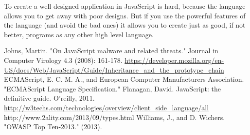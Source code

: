 \documentclass{report}
\begin{document}
To create a well designed application in JavaScript is hard, because the language allows you to get away with poor designs. But if you use the powerful features of the language (and avoid the bad ones) it allows you to create just as good, if not better, programs as any other high level language.
\begin{thebibliography}{99}
Johns, Martin. "On JavaScript malware and related threats." Journal in Computer Virology 4.3 (2008): 161-178.
\url{https://developer.mozilla.org/en-US/docs/Web/JavaScript/Guide/Inheritance\_and\_the\_prototype\_chain}
ECMAScript, E. C. M. A., and European Computer Manufacturers Association. "ECMAScript Language Specification."
Flanagan, David. JavaScript: the definitive guide. O'reilly, 2011.
\url{http://w3techs.com/technologies/overview/client_side_language/all}
http://www.2ality.com/2013/09/types.html
Williams, J., and D. Wichers. "OWASP Top Ten-2013." (2013).
\end{thebibliography}
\end{document}
